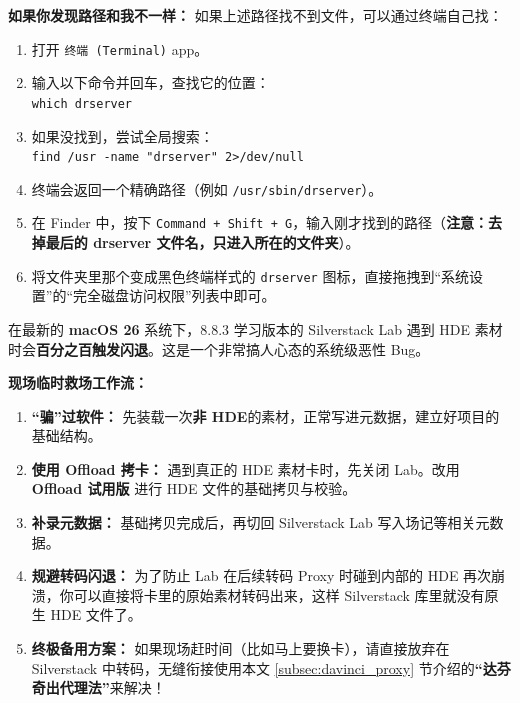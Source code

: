 \documentclass[10pt, a5paper]{article}
\begin{document}
\textbf{如果你发现路径和我不一样：}
如果上述路径找不到文件，可以通过终端自己找：
\begin{enumerate}
    \item 打开 \texttt{终端 (Terminal)} app。
    \item 输入以下命令并回车，查找它的位置：\\
          \texttt{which drserver}
    \item 如果没找到，尝试全局搜索：\\
          \texttt{find /usr -name "drserver" 2>/dev/null}
    \item 终端会返回一个精确路径（例如 \texttt{/usr/sbin/drserver}）。
    \item 在 Finder 中，按下 \texttt{Command + Shift + G}，输入刚才找到的路径（\textbf{注意：去掉最后的 drserver 文件名，只进入所在的文件夹}）。
    \item 将文件夹里那个变成黑色终端样式的 \texttt{drserver} 图标，直接拖拽到“系统设置”的“完全磁盘访问权限”列表中即可。
\end{enumerate}

\vspace{0.3cm}
\begin{tcolorbox}[colback=white, colframe=AlertRed, boxrule=1pt, arc=1mm, breakable, title={\textcolor{WarningYellow}{\faExclamationTriangle} \textbf{严重警告：macOS 26 与 Silverstack 8.8.3 的 HDE 闪退 Bug}}]
\small
在最新的 \textbf{macOS 26} 系统下，8.8.3 学习版本的 Silverstack Lab 遇到 HDE 素材时会\textbf{百分之百触发闪退}。这是一个非常搞人心态的系统级恶性 Bug。

\textbf{现场临时救场工作流：}
\begin{enumerate}
    \item \textbf{“骗”过软件：} 先装载一次\textbf{非 HDE}的素材，正常写进元数据，建立好项目的基础结构。
    \item \textbf{使用 Offload 拷卡：} 遇到真正的 HDE 素材卡时，先关闭 Lab。改用 \textbf{Offload 试用版} 进行 HDE 文件的基础拷贝与校验。
    \item \textbf{补录元数据：} 基础拷贝完成后，再切回 Silverstack Lab 写入场记等相关元数据。
    \item \textbf{规避转码闪退：} 为了防止 Lab 在后续转码 Proxy 时碰到内部的 HDE 再次崩溃，你可以直接将卡里的原始素材转码出来，这样 Silverstack 库里就没有原生 HDE 文件了。
    \item \textbf{终极备用方案：} 如果现场赶时间（比如马上要换卡），请直接放弃在 Silverstack 中转码，无缝衔接使用本文 \ref{subsec:davinci_proxy} 节介绍的\textbf{“达芬奇出代理法”}来解决！
\end{enumerate}
\end{tcolorbox}
\end{document}
